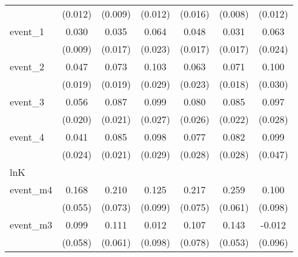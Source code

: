 {\begin{tabular}{l*{6}{c}}
            &     (0.012)         &     (0.009)         &     (0.012)         &     (0.016)         &     (0.008)         &     (0.012)         \\
[1em]
event\_1     &       0.030\sym{**} &       0.035\sym{*}  &       0.064\sym{**} &       0.048\sym{**} &       0.031         &       0.063\sym{**} \\
            &     (0.009)         &     (0.017)         &     (0.023)         &     (0.017)         &     (0.017)         &     (0.024)         \\
[1em]
event\_2     &       0.047\sym{*}  &       0.073\sym{***}&       0.103\sym{***}&       0.063\sym{**} &       0.071\sym{***}&       0.100\sym{***}\\
            &     (0.019)         &     (0.019)         &     (0.029)         &     (0.023)         &     (0.018)         &     (0.030)         \\
[1em]
event\_3     &       0.056\sym{**} &       0.087\sym{***}&       0.099\sym{***}&       0.080\sym{**} &       0.085\sym{***}&       0.097\sym{***}\\
            &     (0.020)         &     (0.021)         &     (0.027)         &     (0.026)         &     (0.022)         &     (0.028)         \\
[1em]
event\_4     &       0.041         &       0.085\sym{***}&       0.098\sym{***}&       0.077\sym{**} &       0.082\sym{**} &       0.099\sym{*}  \\
            &     (0.024)         &     (0.021)         &     (0.029)         &     (0.028)         &     (0.028)         &     (0.047)         \\
\hline
lnK         &                     &                     &                     &                     &                     &                     \\
event\_m4    &       0.168\sym{**} &       0.210\sym{**} &       0.125         &       0.217\sym{**} &       0.259\sym{***}&       0.100         \\
            &     (0.055)         &     (0.073)         &     (0.099)         &     (0.075)         &     (0.061)         &     (0.098)         \\
[1em]
event\_m3    &       0.099         &       0.111         &       0.012         &       0.107         &       0.143\sym{**} &      -0.012         \\
            &     (0.058)         &     (0.061)         &     (0.098)         &     (0.078)         &     (0.053)         &     (0.096)         \\

\end{tabular}}
